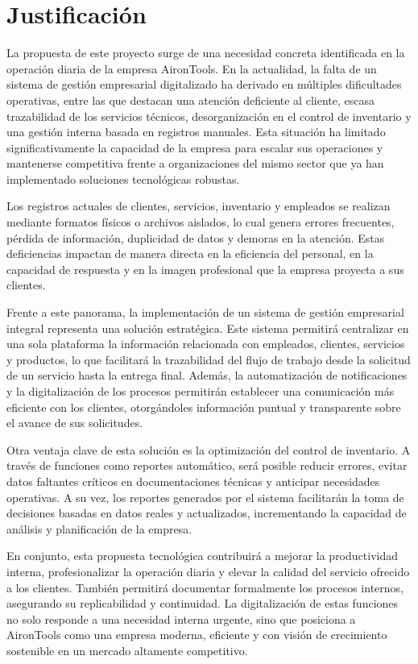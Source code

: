 \section{Justificación}

La propuesta de este proyecto surge de una necesidad concreta identificada en la operación diaria de la empresa AironTools. En la actualidad, la falta de un sistema de gestión empresarial digitalizado ha derivado en múltiples dificultades operativas, entre las que destacan una atención deficiente al cliente, escasa trazabilidad de los servicios técnicos, desorganización en el control de inventario y una gestión interna basada en registros manuales. Esta situación ha limitado significativamente la capacidad de la empresa para escalar sus operaciones y mantenerse competitiva frente a organizaciones del mismo sector que ya han implementado soluciones tecnológicas robustas.

Los registros actuales de clientes, servicios, inventario y empleados se realizan mediante formatos físicos o archivos aislados, lo cual genera errores frecuentes, pérdida de información, duplicidad de datos y demoras en la atención. Estas deficiencias impactan de manera directa en la eficiencia del personal, en la capacidad de respuesta y en la imagen profesional que la empresa proyecta a sus clientes.

Frente a este panorama, la implementación de un sistema de gestión empresarial integral representa una solución estratégica. Este sistema permitirá centralizar en una sola plataforma la información relacionada con empleados, clientes, servicios y productos, lo que facilitará la trazabilidad del flujo de trabajo desde la solicitud de un servicio hasta la entrega final. Además, la automatización de notificaciones y la digitalización de los procesos permitirán establecer una comunicación más eficiente con los clientes, otorgándoles información puntual y transparente sobre el avance de sus solicitudes.

Otra ventaja clave de esta solución es la optimización del control de inventario. A través de funciones como reportes automático, será posible reducir errores, evitar datos faltantes críticos en documentaciones técnicas y anticipar necesidades operativas. A su vez, los reportes generados por el sistema facilitarán la toma de decisiones basadas en datos reales y actualizados, incrementando la capacidad de análisis y planificación de la empresa.

En conjunto, esta propuesta tecnológica contribuirá a mejorar la productividad interna, profesionalizar la operación diaria y elevar la calidad del servicio ofrecido a los clientes. También permitirá documentar formalmente los procesos internos, asegurando su replicabilidad y continuidad. La digitalización de estas funciones no solo responde a una necesidad interna urgente, sino que posiciona a AironTools como una empresa moderna, eficiente y con visión de crecimiento sostenible en un mercado altamente competitivo.

